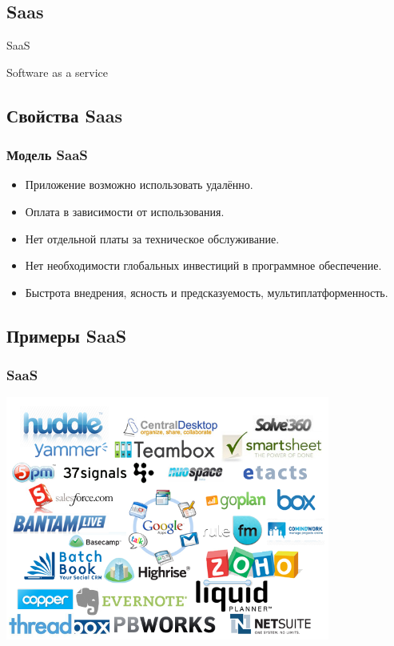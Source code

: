 \documentclass[compress,red]{beamer}
\begin{document}
\subsection{Saas}
\begin{frame}
  \begin{center}
    \Huge{SaaS}
  \end{center}
  \begin{center}
    \Large{Software as a service}
  \end{center}
\end{frame}

\subsection{Свойства Saas}
\begin{frame}[fragile]
  \frametitle{Модель SaaS}
  \begin{itemize}
    \item Приложение возможно использовать удалённо.
    \item Оплата в зависимости от использования.
    \item Нет отдельной платы за техническое обслуживание.
    \item Нет необходимости глобальных инвестиций в программное обеспечение.
    \item Быстрота внедрения, ясность и предсказуемость, мультиплатформенность.
  \end{itemize}
\end{frame}

\subsection{Примеры SaaS}
\begin{frame}[fragile]
  \frametitle{SaaS}
  \centerline{\includegraphics[width=0.8\textwidth]{images/saas.png}}
\end{frame}
\end{document}
